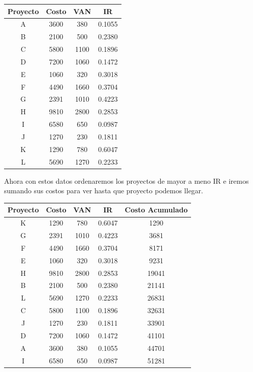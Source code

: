 \documentclass{templateNote}
\begin{document}
\begin{center}
    \begin{tabular}{|c|c|c|c|}
        \hline
        Proyecto & Costo & VAN & IR \\
        \hline
        A & 3600 & 380 & 0.1055 \\
        B & 2100 & 500 & 0.2380 \\
        C & 5800 & 1100 & 0.1896 \\
        D & 7200 & 1060 & 0.1472 \\
        E & 1060 & 320 & 0.3018 \\
        F & 4490 & 1660 & 0.3704 \\
        G & 2391 & 1010 & 0.4223 \\
        H & 9810 & 2800 & 0.2853 \\
        I & 6580 & 650 & 0.0987 \\
        J & 1270 & 230 & 0.1811 \\
        K & 1290 & 780 & 0.6047 \\
        L & 5690 & 1270 & 0.2233 \\
        \hline
    \end{tabular}
\end{center}

Ahora con estos datos ordenaremos los proyectos de mayor a meno IR e iremos sumando sus costos para ver hasta que proyecto podemos llegar.

\begin{center}
    \begin{tabular}{|c|c|c|c|c|}
        \hline
        Proyecto & Costo & VAN & IR & Costo Acumulado\\
        \hline
        K & 1290 & 780 & 0.6047 & 1290 \\   
        G & 2391 & 1010 & 0.4223 & 3681 \\
        F & 4490 & 1660 & 0.3704 & 8171 \\
        E & 1060 & 320 & 0.3018 & 9231 \\
        H & 9810 & 2800 & 0.2853 & 19041 \\
        B & 2100 & 500 & 0.2380 & 21141 \\
        L & 5690 & 1270 & 0.2233 & 26831 \\
        C & 5800 & 1100 & 0.1896 & 32631 \\
        J & 1270 & 230 & 0.1811 & 33901 \\
        D & 7200 & 1060 & 0.1472 & 41101 \\
        A & 3600 & 380 & 0.1055 & 44701 \\
        I & 6580 & 650 & 0.0987 & 51281 \\
        \hline
    \end{tabular}
\end{center}
\end{document}

